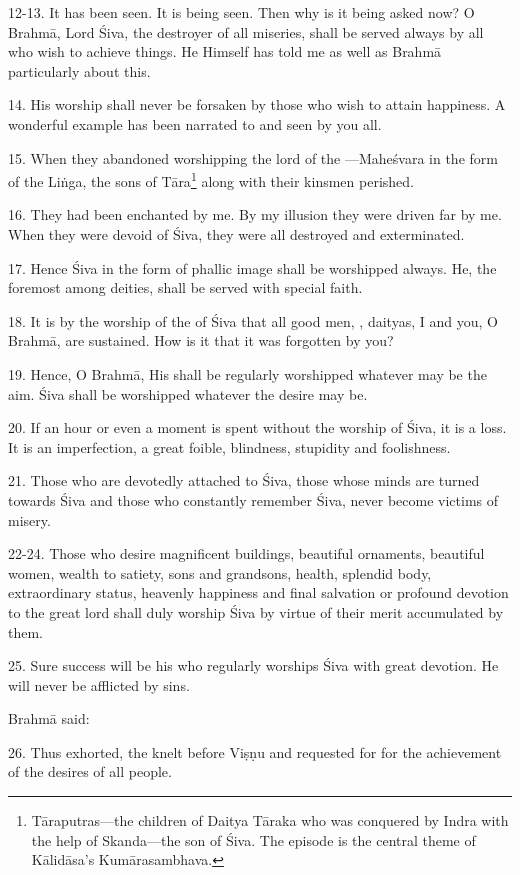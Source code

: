 12-13. It has been seen. It is being seen. Then why is it being asked now?
O Brahmā, Lord Śiva, the destroyer of all miseries, shall be served always by
all who wish to achieve things. He Himself has told me as well as Brahmā
particularly about this.

14. His worship shall never be forsaken by those who wish to attain happiness.
A wonderful example has been narrated to and seen by you all.

15. When they abandoned worshipping the lord of the —Maheśvara in
the form of the Liṅga, the sons of Tāra\footnote{Tāraputras—the children of
Daitya Tāraka who was conquered by Indra with the help of Skanda—the son of Śiva.
The episode is the central theme of Kālidāsa’s Kumārasambhava.} along with their
kinsmen perished.

16. They had been enchanted by me. By my illusion they were driven far by me.
When they were devoid of Śiva, they were all destroyed and exterminated.

17. Hence Śiva in the form of phallic image shall be worshipped always. He,
the foremost among deities, shall be served with special faith.

18. It is by the worship of the  of Śiva that all good men, ,
daityas, I and you, O Brahmā, are sustained. How is it that it was forgotten
by you?

19. Hence, O Brahmā, His  shall be regularly worshipped whatever may
be the aim. Śiva shall be worshipped whatever the desire may be.

20. If an hour or even a moment is spent without the worship of Śiva, it is
a loss. It is an imperfection, a great foible, blindness, stupidity and
foolishness.

21. Those who are devotedly attached to Śiva, those whose minds are turned
towards Śiva and those who constantly remember Śiva, never become victims
of misery.

22-24. Those who desire magnificent buildings, beautiful ornaments, beautiful
women, wealth to satiety, sons and grandsons, health, splendid body,
extraordinary status, heavenly happiness and final salvation or profound
devotion to the great lord shall duly worship Śiva by virtue of their merit
accumulated by them.

25. Sure success will be his who regularly worships Śiva  with great
devotion. He will never be afflicted by sins.

Brahmā said:

26. Thus exhorted, the  knelt before Viṣṇu and requested for
 for the achievement of the desires of all people.

